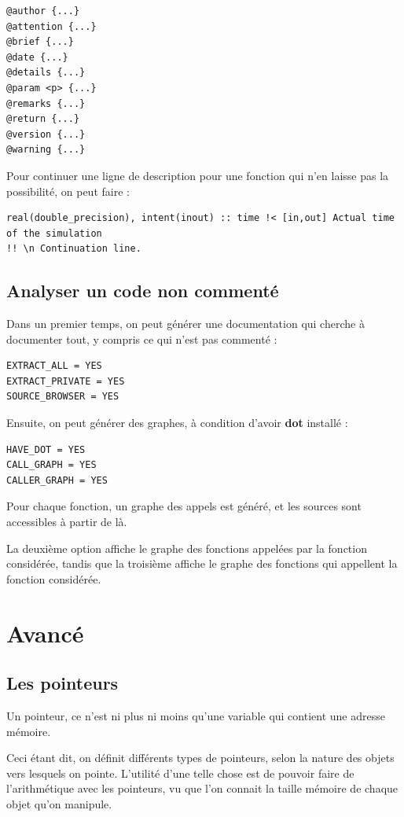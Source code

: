\documentclass[a4paper,twoside]{article}
\begin{document}
\begin{verbatim}
@author {...}
@attention {...}
@brief {...}
@date {...}
@details {...}
@param <p> {...}
@remarks {...}
@return {...}
@version {...}
@warning {...}
\end{verbatim}

\begin{remarque}
Pour continuer une ligne de description pour une fonction qui n'en laisse pas la possibilité, on peut faire : 
\begin{verbatim}
real(double_precision), intent(inout) :: time !< [in,out] Actual time of the simulation
!! \n Continuation line. 
\end{verbatim}
\end{remarque}


\subsection{Analyser un code non commenté}
Dans un premier temps, on peut générer une documentation qui cherche à documenter tout, y compris ce qui n'est pas commenté : 
\begin{verbatim}
EXTRACT_ALL = YES
EXTRACT_PRIVATE = YES
SOURCE_BROWSER = YES
\end{verbatim}

Ensuite, on peut générer des graphes, à condition d'avoir \textbf{dot} installé : 
\begin{verbatim}
HAVE_DOT = YES
CALL_GRAPH = YES
CALLER_GRAPH = YES
\end{verbatim}
Pour chaque fonction, un graphe des appels est généré, et les sources sont accessibles à partir de là. 

La deuxième option affiche le graphe des fonctions appelées par la fonction considérée, tandis que la troisième affiche le graphe des fonctions qui appellent la fonction considérée.

\section{Avancé}
\subsection{Les pointeurs}
Un pointeur, ce n'est ni plus ni moins qu'une variable qui contient une adresse mémoire. 

Ceci étant dit, on définit différents types de pointeurs, selon la nature des objets vers lesquels on pointe. L'utilité d'une telle chose est de pouvoir faire de l'arithmétique avec les pointeurs, vu que l'on connait la taille mémoire de chaque objet qu'on manipule. 
\end{document}
